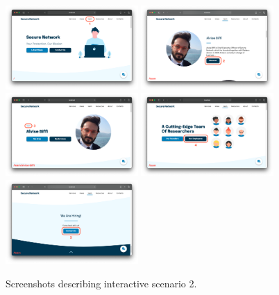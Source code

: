 \documentclass[12pt]{report}
\begin{document}
\begin{figure}[H]
	\centering
	\includegraphics[width=0.45\textwidth]{scenarios/2/1.png}
	\includegraphics[width=0.45\textwidth]{scenarios/2/2.png}
	\includegraphics[width=0.45\textwidth]{scenarios/2/3.png}
	\includegraphics[width=0.45\textwidth]{scenarios/2/4.png}
	\includegraphics[width=0.45\textwidth]{scenarios/2/5.png}
	\caption{Screenshots describing interactive scenario 2.}
\end{figure}

\clearpage
\end{document}
